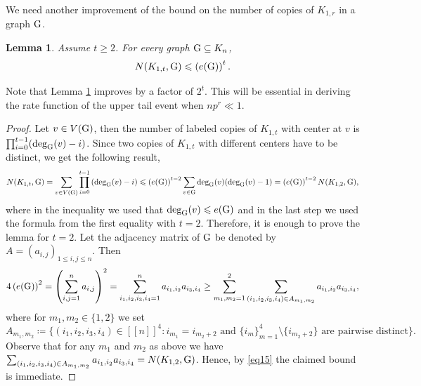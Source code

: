 \documentclass[a4paper,11pt,english,reqno]{amsart}
\numberwithin{equation}{section}
\renewcommand{\leq}{\leqslant}
\renewcommand{\geq}{\geqslant}
\newcommand{\tu}[1]{\textup{#1}}
\newcommand{\set}[1]{[\![#1]\!]}
\newtheorem{lemma}[theorem]{Lemma}
\begin{document}
			{We need another improvement of the bound on the number of copies of $K_{1,r}$ in a graph $\tu{G}$.}
			\begin{lemma}
				\label{global embedding bound}
				Assume $t\geq 2$.
				For every graph $\tu{G}\subseteq K_n$, 
				\begin{equation*}
					N(K_{1,t}, \tu{G})\leq \left(e(\tu{G})\right)^{t}.
				\end{equation*}
			\end{lemma}
			Note that Lemma \ref{global embedding bound} improves \cite[Theorem~5.7]{HMS} by a factor of $2^t$. This will be essential in deriving the rate function of the upper tail event when $np^{r}\ll 1$.   
			\begin{proof}
				Let $v\in V(\tu{G})$, then the number of labeled copies of $K_{1,t}$ with center at $v$ is $\prod_{i=0}^{t-1}(\text{deg}_{\tu{G}}(v)-i)$. Since two copies of $K_{1,t}$ with different centers have to be distinct, we get the following result,
				\begin{equation*}
					N(K_{1,t}, \tu{G})=\sum_{v\in V(\tu{G})}\prod_{i=0}^{t-1}\left(\text{deg}_{\tu{G}}(v)-i\right)\leq \left(e(\tu{G})\right)^{t-2} \sum_{v\in \tu{G}}\text{deg}_{\tu{G}}(v)(\text{deg}_{\tu{G}}(v)-1) = \left(e(\tu{G})\right)^{t-2}N(K_{1,2},\tu{G}),
				\end{equation*}
				where in the inequality we used that $\text{deg}_{\tu{G}}(v)\leq e(\tu{G})$ and in the last step we used the formula from the first equality with $t=2$. Therefore, it is enough to prove the lemma for $t=2$.
				Let the adjacency matrix of $\tu{G}$ be denoted by $A=(a_{i,j})_{1\leq i,j\leq n}$. Then
				\begin{equation}
					\label{eq15}
					4\left(e(\tu{G})\right)^{2} = \left(\sum_{i,j=1}^{n}a_{i,j}\right)^{2} = \sum_{i_1,i_2,i_3,i_4=1}^{n}a_{i_1,i_2}a_{i_3,i_4} \ge \sum_{m_1,m_2=1}^2 \sum_{(i_1,i_2,i_3,i_4) \in A_{m_1,m_2}} a_{i_1,i_2}a_{i_3,i_4}, 
				\end{equation}
				where for  $m_1, m_2 \in \{1,2\}$ we set 
				\[
				A_{m_1,m_2} \coloneqq \{(i_1,i_2,i_3,i_4)\in \set{n}^4: i_{m_1}=i_{m_2+2} \text{ and } \{i_m\}_{m=1}^4\setminus\{i_{m_2+2}\} \text{ are pairwise distinct}\}. 
				\]
				Observe that for any $m_1$ and $m_2$ as above we have $\sum_{(i_1,i_2,i_3,i_4) \in A_{m_1,m_2}} a_{i_1,i_2}a_{i_3,i_4} = N(K_{1,2}, \tu{G})$. Hence, by \eqref{eq15} the claimed bound is immediate.
			\end{proof}
			
\end{document}
